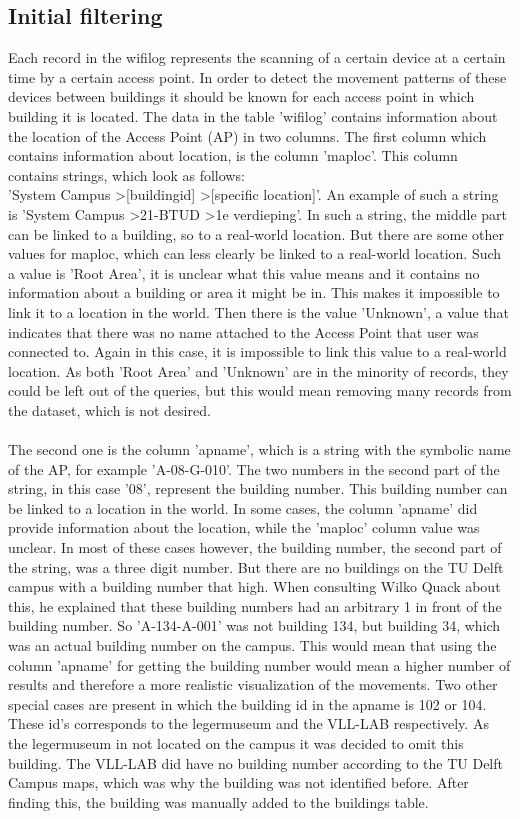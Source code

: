 \subsection{Initial filtering}\label{initialfiltering}
Each record in the wifilog represents the scanning of a certain device at a certain time by a certain access point. In order to detect the movement patterns of these devices between buildings it should be known for each access point in which building it is located. The data in the table 'wifilog' contains information about the location of the Access Point (AP) in two columns. The first column which contains information about location, is the column 'maploc'. This column contains strings, which look as follows: 
\\
'System Campus \textgreater [buildingid] \textgreater [specific location]'. An example of such a string is 'System Campus \textgreater 21-BTUD \textgreater 1e verdieping'. In such a string, the middle part can be linked to a building, so to a real-world location. But there are some other values for maploc, which can less clearly be linked to a real-world location. Such a value is 'Root Area', it is unclear what this value means and it contains no information about a building or area it might be in. This makes it impossible to link it to a location in the world. Then there is the value 'Unknown', a value that indicates that there was no name attached to the Access Point that user was connected to. Again in this case, it is impossible to link this value to a real-world location. As both 'Root Area' and 'Unknown' are in the minority of records, they could be left out of the queries, but this would mean removing many records from the dataset, which is not desired.
\\\\
The second one is the column 'apname', which is a string with the symbolic name of the AP, for example 'A-08-G-010'. The two numbers in the second part of the string, in this case '08', represent the building number. This building number can be linked to a location in the world. In some cases, the column 'apname' did provide information about the location, while the 'maploc' column value was unclear. In most of these cases however, the building number, the second part of the string, was a three digit number. But there are no buildings on the TU Delft campus with a building number that high. When consulting Wilko Quack about this, he explained that these building numbers had an arbitrary 1 in front of the building number. So 'A-134-A-001' was not building 134, but building 34, which was an actual building number on the campus. This would mean that using the column 'apname' for getting the building number would mean a higher number of results and therefore a more realistic visualization of the movements. Two other special cases are present in which the building id in the apname is 102 or 104. These id’s corresponds to the legermuseum and the VLL-LAB respectively. As the legermuseum in not located on the campus it was decided to omit this building. The VLL-LAB did have no building number according to the TU Delft Campus maps, which was why the building was not identified before. After finding this, the building was manually added to the buildings table.
